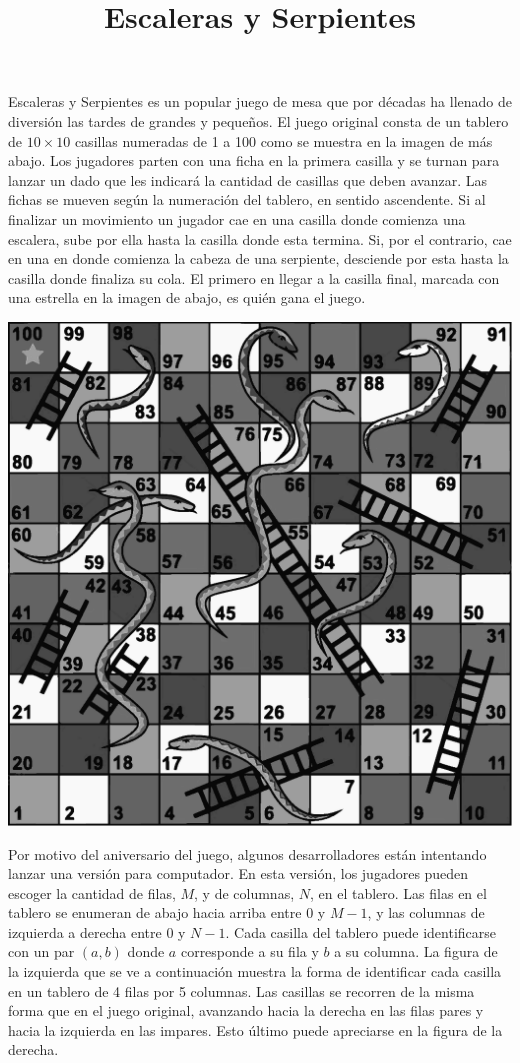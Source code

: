 \documentclass{oci}
\title{Escaleras y Serpientes}
\begin{document}
\begin{problemDescription}
  Escaleras y Serpientes es un popular juego de mesa que por décadas ha
  llenado de diversión las tardes de grandes y pequeños.
  El juego original consta de un tablero de $10\times 10$ casillas numeradas de
  1 a 100 como se muestra en la imagen de más abajo.
  Los jugadores parten con una ficha en la primera casilla y se turnan para
  lanzar un dado que les indicará la cantidad de casillas que deben avanzar.
  Las fichas se mueven según la numeración del tablero, en sentido ascendente.
  Si al finalizar un movimiento un jugador cae en una casilla donde comienza una
  escalera, sube por ella hasta la casilla donde esta termina.
  Si, por el contrario, cae en una en donde comienza la cabeza de una serpiente,
  desciende por esta hasta la casilla donde finaliza su cola.
  El primero en llegar a la casilla final, marcada con una estrella en la
  imagen de abajo, es quién gana el juego.

  \begin{center}
  \includegraphics[scale=0.7]{tablero}
  \end{center}

  Por motivo del aniversario del juego, algunos desarrolladores están intentando
  lanzar una versión para computador.
  En esta versión, los jugadores pueden escoger la cantidad de filas, $M$, y de
  columnas, $N$, en el tablero.
  Las filas en el tablero se enumeran de abajo hacia arriba entre 0 y $M-1$, y
  las columnas de izquierda a derecha entre 0 y $N-1$.
  Cada casilla del tablero puede identificarse con un par $(a, b)$ donde $a$
  corresponde a su fila y $b$ a su columna.
  La figura de la izquierda que se ve a continuación muestra la forma de
  identificar cada casilla en un tablero de 4 filas por 5 columnas.
  Las casillas se recorren de la misma forma que en el juego original, avanzando
  hacia la derecha en las filas pares y hacia la izquierda en las impares.
  Esto último puede apreciarse en la figura de la derecha.


\end{problemDescription}
\end{document}
